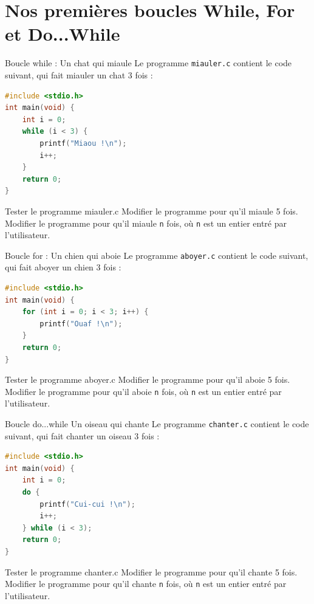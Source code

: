 
\section{Nos premières boucles While, For et Do...While}


\begin{UPSTIexercice}{Boucle while : Un chat qui miaule}
	Le programme \texttt{miauler.c} contient le code suivant, qui fait miauler un chat 3 fois :
	\begin{lstlisting}[language=c]
#include <stdio.h>
int main(void) {
    int i = 0;
    while (i < 3) {
        printf("Miaou !\n");
        i++;
    }
    return 0;
}
\end{lstlisting}
	\UPSTIetape Tester le programme miauler.c
	\UPSTIetape Modifier le programme pour qu'il miaule 5 fois.
	\UPSTIetape Modifier le programme pour qu'il miaule \texttt{n} fois, où \texttt{n} est un entier entré par l'utilisateur.
\end{UPSTIexercice}



\begin{UPSTIexercice}{Boucle for : Un chien qui aboie}
	Le programme \texttt{aboyer.c} contient le code suivant, qui fait aboyer un chien 3 fois :
	\begin{lstlisting}[language=c]
#include <stdio.h>
int main(void) {
    for (int i = 0; i < 3; i++) {
        printf("Ouaf !\n");
    }
    return 0;
}
\end{lstlisting}
	\UPSTIetape Tester le programme aboyer.c
	\UPSTIetape Modifier le programme pour qu'il aboie 5 fois.
	\UPSTIetape Modifier le programme pour qu'il aboie \texttt{n} fois, où \texttt{n} est un entier entré par l'utilisateur.
\end{UPSTIexercice}



\begin{UPSTIexercice}{Boucle do...while Un oiseau qui chante}
	Le programme \texttt{chanter.c} contient le code suivant, qui fait chanter un oiseau 3 fois :
	\begin{lstlisting}[language=c]
#include <stdio.h>
int main(void) {
    int i = 0;
    do {
        printf("Cui-cui !\n");
        i++;
    } while (i < 3);
    return 0;
}
\end{lstlisting}
	\UPSTIetape Tester le programme chanter.c
	\UPSTIetape Modifier le programme pour qu'il chante 5 fois.
	\UPSTIetape Modifier le programme pour qu'il chante \texttt{n} fois, où \texttt{n} est un entier entré par l'utilisateur.
\end{UPSTIexercice}

